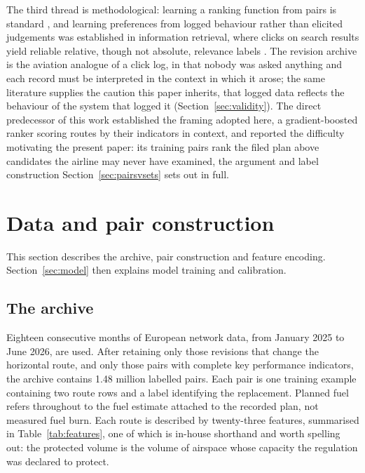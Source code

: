 \documentclass[preprint,authoryear,12pt]{elsarticle}
\begin{document}
The third thread is methodological: learning a ranking function from
pairs is standard \citep{burges2005,liu2009}, and learning preferences
from logged behaviour rather than elicited judgements was established
in information retrieval, where clicks on search results yield
reliable relative, though not absolute, relevance labels
\citep{joachims2002}. The revision archive is the aviation analogue of
a click log, in that nobody was asked anything and each record must be interpreted in the context in which it arose; the same literature supplies the caution this paper
inherits, that logged data reflects the behaviour of the system that
logged it (Section~\ref{sec:validity}). The direct predecessor of
this work \citep{dalmau2024} established the framing adopted here, a
gradient-boosted ranker scoring routes by their indicators in context,
and reported the difficulty motivating the present paper: its
training pairs rank the filed plan above candidates the airline may
never have examined, the argument and label construction
Section~\ref{sec:pairsvsets} sets out in full.

\section{Data and pair construction}
\label{sec:data}

This section describes the archive, pair construction and feature
encoding. Section~\ref{sec:model} then explains model training and calibration.

\subsection{The archive}

Eighteen consecutive months of European network data, from January 2025
to June 2026, are used. After retaining only those revisions that
change the horizontal route, and only those pairs with complete key
performance indicators, the archive contains 1.48 million labelled
pairs. Each pair is one training example containing two route rows and
a label identifying the replacement. Planned fuel refers throughout to
the fuel estimate attached to the recorded plan, not measured fuel burn.
Each route is described by twenty-three features, summarised in
Table~\ref{tab:features}, one of which is in-house shorthand and worth
spelling out: the protected volume is the volume of airspace whose
capacity the regulation was declared to protect.
\end{document}
